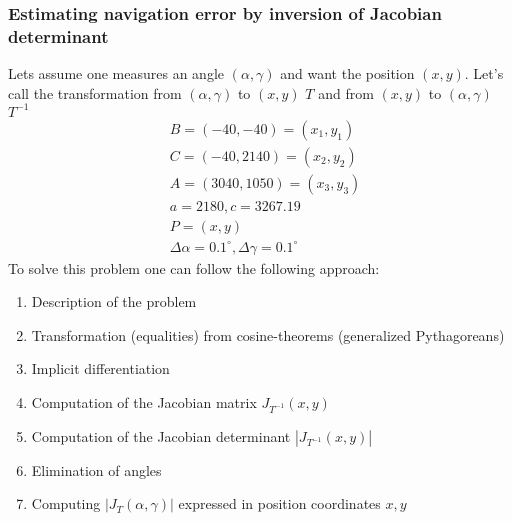 \subsubsection{Estimating navigation error by inversion of Jacobian determinant}
Lets assume one measures an angle $(\alpha, \gamma)$ and want the position $(x,y)$. Let's call the transformation from $(\alpha, \gamma)$ to $(x,y)$ $T$ and from $(x,y)$ to $(\alpha, \gamma)$ $T^{-1}$
$$
\begin{aligned}
&B=(-40,-40)=\left(x_1, y_1\right) \\
&C=(-40,2140)=\left(x_2, y_2\right) \\
&A=(3040,1050)=\left(x_3, y_3\right) \\
&a=2180, c=3267.19 \\
&P=(x, y) \\
&\Delta \alpha=0.1^{\circ}, \Delta \gamma=0.1^{\circ}
\end{aligned}
$$
To solve this problem one can follow the following approach:
\begin{enumerate}
    \item Description of the problem
    \item Transformation (equalities) from cosine-theorems (generalized Pythagoreans)
    \item Implicit differentiation
    \item Computation of the Jacobian matrix $J_{T^{-1}}(x, y)$
    \item Computation of the Jacobian determinant $\left|J_{T^{-1}}(x, y)\right|$
    \item Elimination of angles
    \item Computing $\left|J_T(\alpha, \gamma)\right|$ expressed in position coordinates $x, y$
\end{enumerate}
